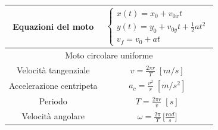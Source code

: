 \begin{tabular}{|c|c|}
        \hline Equazioni del moto &
            $
                \begin{cases}
                    x(t) = x_0 + v_{0x}t \\
                    y(t) = y_0 + v_{0y}t + \frac{1}{2}at^2\\
                    v_{f} = v_{0} + at
                \end{cases}
            $
            \\
    \hline

    \multicolumn{2}{|c|}{Moto circolare uniforme} \\

        \hline Velocità tangenziale &
            $
                v = \frac{2\pi r}{T} \; [m/s]
            $
            \\

        \hline Accelerazione centripeta &
            $
                a_c = \frac{v^2}{r} \; [m/s^2]
            $
            \\

        \hline Periodo &
            $
                T = \frac{2\pi r}{v} \; [s]
            $
            \\

        \hline Velocità angolare &
            $
                \omega = \frac{2\pi}{T} \, \Bigg[\frac{rad}{s} \Bigg]
            $
            \\
        \hline
\end{tabular}

